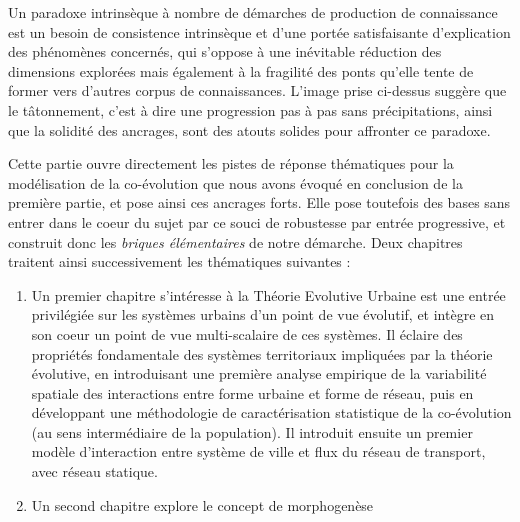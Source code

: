 

Un paradoxe intrinsèque à nombre de démarches de production de connaissance est un besoin de consistence intrinsèque et d'une portée satisfaisante d'explication des phénomènes concernés, qui s'oppose à une inévitable réduction des dimensions explorées mais également à la fragilité des ponts qu'elle tente de former vers d'autres corpus de connaissances. L'image prise ci-dessus suggère que le tâtonnement, c'est à dire une progression pas à pas sans précipitations, ainsi que la solidité des ancrages, sont des atouts solides pour affronter ce paradoxe.


Cette partie ouvre directement les pistes de réponse thématiques pour la modélisation de la co-évolution que nous avons évoqué en conclusion de la première partie, et pose ainsi ces ancrages forts. Elle pose toutefois des bases sans entrer dans le coeur du sujet par ce souci de robustesse par entrée progressive, et construit donc les \emph{briques élémentaires} de notre démarche. Deux chapitres traitent ainsi successivement les thématiques suivantes :
\begin{enumerate}
	\item Un premier chapitre s'intéresse à la Théorie Evolutive Urbaine est une entrée privilégiée sur les systèmes urbains d'un point de vue évolutif, et intègre en son coeur un point de vue multi-scalaire de ces systèmes. Il éclaire des propriétés fondamentale des systèmes territoriaux impliquées par la théorie évolutive, en introduisant une première analyse empirique de la variabilité spatiale des interactions entre forme urbaine et forme de réseau, puis en développant une méthodologie de caractérisation statistique de la co-évolution (au sens intermédiaire de la population). Il introduit ensuite un premier modèle d'interaction entre système de ville et flux du réseau de transport, avec réseau statique.
	\item Un second chapitre explore le concept de morphogenèse
\end{enumerate}















